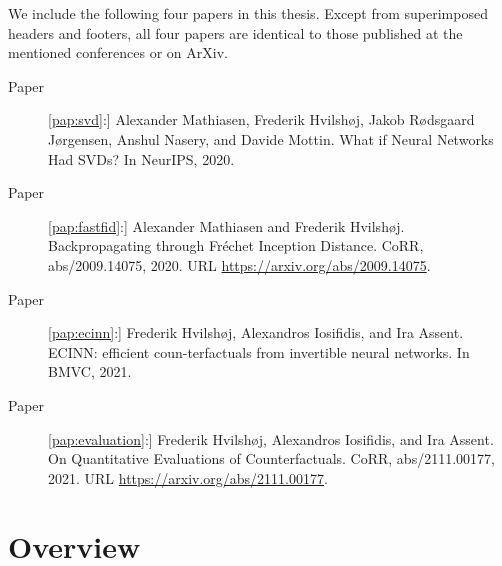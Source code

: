 \documentclass[11pt,a4paper,twoside,openright,final]{memoir}
\newcommand*{\paperref}[1]{Paper~\hyperref[#1]{\ref{#1}}}
\begin{document}
We include the following four papers in this thesis. Except from superimposed headers and footers, all four papers are identical to those published at the mentioned conferences or on ArXiv.
\begin{description}
    \item[\paperref{pap:svd}:] \cite{fasth} Alexander Mathiasen, Frederik Hvilsh\o j, Jakob R\o dsgaard J\o rgensen, Anshul Nasery, and Davide Mottin. What if Neural Networks Had SVDs? In NeurIPS, 2020.
    \item[\paperref{pap:fastfid}:] \cite{fastfid} Alexander Mathiasen and Frederik Hvilsh\o j.  Backpropagating through Fr\'echet Inception Distance. CoRR, abs/2009.14075, 2020.  URL \url{https://arxiv.org/abs/2009.14075}.
    \item[\paperref{pap:ecinn}:] \cite{ecinn} Frederik Hvilsh\o j, Alexandros Iosifidis, and Ira Assent. ECINN: efficient coun-terfactuals from invertible neural networks. In BMVC, 2021. 
    \item[\paperref{pap:evaluation}:] \cite{evaluation} Frederik Hvilsh\o j, Alexandros Iosifidis, and Ira Assent. On Quantitative Evaluations of Counterfactuals. CoRR, abs/2111.00177, 2021. URL \url{https://arxiv.org/abs/2111.00177}.
\end{description}

\cleardoublepage

\tableofcontents
\cleardoublepage

\mainmatter 


\part{Overview}
\label{part:overview}

\end{document}
